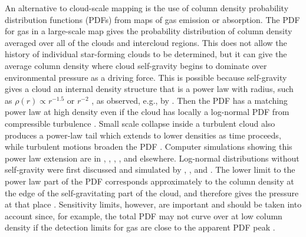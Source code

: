 \documentclass{aa}
\begin{document}
An alternative to cloud-scale mapping is the use of column density probability
distribution functions (PDFs) from maps of gas emission or absorption. The PDF for gas
in a large-scale map gives the probability distribution of column density averaged over
all of the clouds and intercloud regions. This does not allow the history of individual
star-forming clouds to be determined, but it can give the average column density where
cloud self-gravity begins to dominate over environmental pressure as a driving force. This
is possible because self-gravity gives a cloud an internal density structure that is a
power law with radius, such as $\rho(r)\propto r^{-1.5}$ or $r^{-2}$
\citep[e.g.][]{shu77}, as observed, e.g., by \cite{mueller02}. 
Then the PDF has a
matching power law at high density even if the cloud has  locally a log-normal PDF from
compressible turbulence \citep{elmegreen11}. 
Small scale collapse inside a turbulent cloud also produces a power-law tail   
which extends to lower densities as time proceeds, while turbulent motions broaden the PDF 
\citep{2014ApJ...781...91G}. 
Computer simulations showing this power law
extension are in \cite{klessen00}, \cite{vaz08}, \cite{kritsuk11}, \cite{fed13},
\cite{pan16} and elsewhere.  Log-normal distributions without self-gravity were first
discussed and simulated by \cite{vaz94}, \cite{pvs98}, and \cite{pnj97}. The lower
limit to the power law part of the PDF corresponds approximately to the column density
at the edge of the self-gravitating part of the cloud, and therefore gives the pressure
at that place \citep[e.g.,][]{kainulainen11}. 
 Sensitivity limits, however, are important and should be taken into account  since,
 for example, the total PDF may not curve over at low column density if the detection
limits for gas are close to the apparent PDF peak \citep{alves17}.
 
\end{document}
